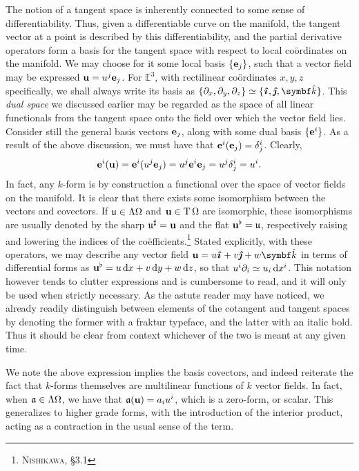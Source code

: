 \noindent
The notion of a tangent space is inherently connected to some sense of differentiability.
Thus, given a differentiable curve on the manifold, the tangent vector at a point is described by this differentiability, and the partial derivative operators form a basis for the tangent space with respect to local coördinates on the manifold.
We may choose for it some local basis $\{ \mathbf{e}_j \}$, such that a vector field may be expressed $\mathbf{u} = u^{j}\mathbf{e}_{j}$.
For $\mathbb{E}^3$, with rectilinear coördinates $x,y,z$ specifically, we shall always write its basis as $\{ \partial_x, \partial_y, \partial_z \} \simeq \{ \ihat, \jhat, \khat \}$.
This \emph{dual space} we discussed earlier may be regarded as the space of all linear functionals from the tangent space onto the field over which the vector field lies.
Consider still the general basis vectors $\mathbf{e}_j$, along with some dual basis $\{ \mathbf{e}^{i} \}$.
As a result of the above discussion, we must have that $\mathbf{e}^{i}(\mathbf{e}_{j}) = \delta_{j}^{i}$.
Clearly,
\[
  \mathbf{e}^{i}(\mathbf{u}) = \mathbf{e}^{i}(u^j \mathbf{e}_j) = u^j \mathbf{e}^{i} \mathbf{e}_{j} = u^j \delta_{j}^{i} = u^i.
\]
In fact, any $k$-form is by construction a functional over the space of vector fields on the manifold.
It is clear that there exists some isomorphism between the vectors and covectors.
If $\mathfrak{u} \in \Lambda\Omega$ and $\mathbf{u} \in \operatorname{T}\Omega$ are isomorphic, these isomorphisms are usually denoted by the sharp $\mathfrak{u}^{\sharp} = \mathbf{u}$ and the flat $\mathbf{u}^{\flat} = \mathfrak{u}$, respectively raising and lowering the indices of the coëfficients.\footnote{\cite{nishikawa2002variational} \textsc{Nishikawa}, \S3.1}
Stated explicitly, with these operators, we may describe any vector field $\uvec = u\ihat + v\jhat + w\khat$ in terms of differential forms as ${\mathbf{u}}^{\flat} = u\,\mathrm{d} x + v\,\mathrm{d} y + w\,\mathrm{d} z$, so that $u^{i} \partial_i \simeq u_{i}\,\mathrm{d} x^{i}$.
This notation however tends to clutter expressions and is cumbersome to read, and it will only be used when strictly necessary.
As the astute reader may have noticed, we already readily distinguish between elements of the cotangent and tangent spaces by denoting the former with a fraktur typeface, and the latter with an italic bold.
Thus it should be clear from context whichever of the two is meant at any given time.

We note the above expression implies the basis covectors, and indeed reiterate the fact that $k$-forms themselves are multilinear functions of $k$ vector fields.
In fact, when $\mathfrak{a}\in\Lambda\Omega$, we have that $\mathfrak{a}(\mathbf{u}) = a_i u^i$, which is a zero-form, or scalar.
This generalizes to higher grade forms, with the introduction of the interior product, acting as a contraction in the usual sense of the term.

